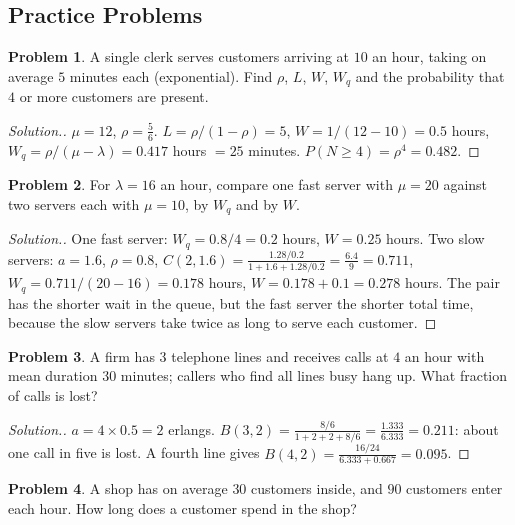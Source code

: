 \documentclass[11pt,a4paper]{article}
\numberwithin{equation}{section}
\theoremstyle{definition}
\newtheorem{problemx}{Problem}[subsection]
\newenvironment{problem}{\begin{problemx}}{\end{problemx}}
\newenvironment{solution}
  {\renewcommand{\qedsymbol}{}\begin{proof}[\textit{Solution}.]}
  {\end{proof}}
\begin{document}
\subsection{Practice Problems}

\begin{problem}
A single clerk serves customers arriving at $10$ an hour, taking on average $5$ minutes each (exponential). Find $\rho$, $L$, $W$, $W_q$ and the probability that $4$ or more customers are present.
\end{problem}

\begin{solution}
$\mu = 12$, $\rho = \frac56$. $L = \rho/(1 - \rho) = 5$, $W = 1/(12 - 10) = 0.5$ hours, $W_q = \rho/(\mu - \lambda) = 0.417$ hours $= 25$ minutes. $P(N \geq 4) = \rho^4 = 0.482$.
\end{solution}

\begin{problem}
For $\lambda = 16$ an hour, compare one fast server with $\mu = 20$ against two servers each with $\mu = 10$, by $W_q$ and by $W$.
\end{problem}

\begin{solution}
One fast server: $W_q = 0.8/4 = 0.2$ hours, $W = 0.25$ hours. Two slow servers: $a = 1.6$, $\rho = 0.8$, $C(2, 1.6) = \frac{1.28/0.2}{1 + 1.6 + 1.28/0.2} = \frac{6.4}9 = 0.711$, $W_q = 0.711/(20 - 16) = 0.178$ hours, $W = 0.178 + 0.1 = 0.278$ hours. The pair has the shorter wait in the queue, but the fast server the
shorter total time, because the slow servers take twice as long to serve each customer.
\end{solution}

\begin{problem}
A firm has $3$ telephone lines and receives calls at $4$ an hour with mean duration $30$ minutes; callers who find all lines busy hang up. What fraction of calls is lost?
\end{problem}

\begin{solution}
$a = 4 \times 0.5 = 2$ erlangs. $B(3, 2) = \frac{8/6}{1 + 2 + 2 + 8/6} = \frac{1.333}{6.333} = 0.211$: about one call in five is lost. A fourth line gives $B(4, 2) = \frac{16/24}{6.333 + 0.667} = 0.095$.
\end{solution}

\begin{problem}
A shop has on average $30$ customers inside, and $90$ customers enter each hour. How long does a customer spend in the shop?
\end{problem}
\end{document}
